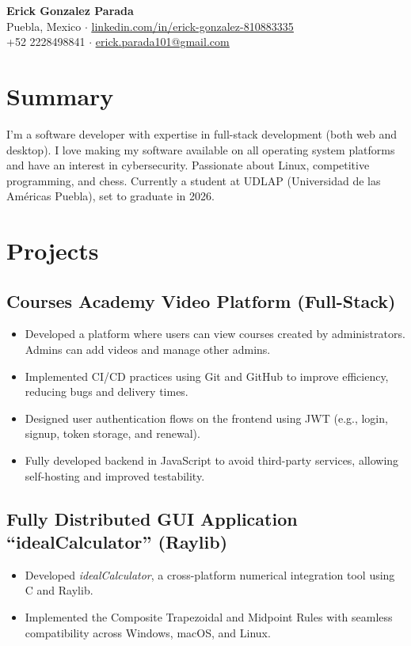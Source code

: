\documentclass[a4paper,10pt]{article}
\begin{document}
\begin{center}
    {\LARGE \textbf{Erick Gonzalez Parada}} \\
    Puebla, Mexico $\cdot$ \underline{\href{https://linkedin.com/in/erick-gonzalez-810883335}{linkedin.com/in/erick-gonzalez-810883335}} \\
    +52 2228498841 $\cdot$ \underline{\href{mailto:erick.parada101@gmail.com}{erick.parada101@gmail.com}}
\end{center}

\section*{Summary}
I'm a software developer with expertise in full-stack development (both web and desktop). I love making my software available on all operating system platforms and have an interest in cybersecurity. Passionate about Linux, competitive programming, and chess. Currently a student at UDLAP (Universidad de las Américas Puebla), set to graduate in 2026.

\section*{Projects}
\subsection*{Courses Academy Video Platform (Full-Stack)}
\begin{itemize}
    \item Developed a platform where users can view courses created by administrators. Admins can add videos and manage other admins.
    \item Implemented CI/CD practices using Git and GitHub to improve efficiency, reducing bugs and delivery times.
    \item Designed user authentication flows on the frontend using JWT (e.g., login, signup, token storage, and renewal).
    \item Fully developed backend in JavaScript to avoid third-party services, allowing self-hosting and improved testability.
\end{itemize}

\subsection*{Fully Distributed GUI Application “idealCalculator” (Raylib)}
\begin{itemize}
    \item Developed \textit{idealCalculator}, a cross-platform numerical integration tool using C and Raylib.
    \item Implemented the Composite Trapezoidal and Midpoint Rules with seamless compatibility across Windows, macOS, and Linux.
\end{itemize}
\end{document}
